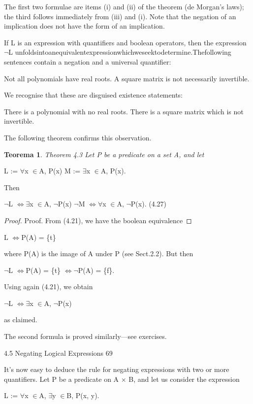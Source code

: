 \documentclass[11pt]{article}
\theoremstyle{plain}
\newtheorem{theorem}{Teorema}[section]
\theoremstyle{definition}
\begin{document}
The first two formulae are items (i) and (ii) of the theorem (de Morgan's laws); the third follows immediately from (iii) and (i). Note that the negation of an implication does not have the form of an implication.

If L is an expression with quantifiers and boolean operators, then the expression $\neg$L unfoldsintoanequivalentexpressionwhichweseektodetermine.Thefollowing sentences contain a negation and a universal quantifier:

Not all polynomials have real roots. A square matrix is not necessarily invertible.

We recognise that these are disguised existence statements:

There is a polynomial with no real roots. There is a square matrix which is not invertible.

The following theorem confirms this observation.

\begin{theorem}
Theorem 4.3 Let P be a predicate on a set A, and let
\end{theorem}

L := $\forall$x $\in$A, P(x) M := $\exists$x $\in$A, P(x).

Then

$\neg$L $\Leftrightarrow$$\exists$x $\in$A, $\neg$P(x) $\neg$M $\Leftrightarrow$$\forall$x $\in$A, $\neg$P(x). (4.27)

\begin{proof}
Proof. From (4.21), we have the boolean equivalence
\end{proof}

L $\Leftrightarrow$P(A) = \{t\}

where P(A) is the image of A under P (see Sect.2.2). But then

$\neg$L $\Leftrightarrow$P(A) = \{t\} $\Leftrightarrow$$\neg$P(A) = \{f\}.

Using again (4.21), we obtain

$\neg$L $\Leftrightarrow$$\exists$x $\in$A, $\neg$P(x)

as claimed.

The second formula is proved similarly---see exercises. 

4.5 Negating Logical Expressions 69

It's now easy to deduce the rule for negating expressions with two or more quantifiers. Let P be a predicate on A $\times$ B, and let us consider the expression

L := $\forall$x $\in$A, $\exists$y $\in$B, P(x, y).
\end{document}
